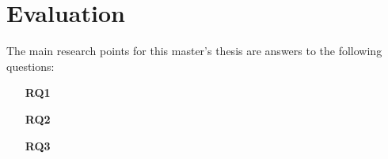 
\chapter{Evaluation}\label{chap:evaluation}

The main research points for this master's thesis are answers to the following questions:
\begin{itemize}
\item[\textbf{RQ1}]
\item[\textbf{RQ2}] 
\item[\textbf{RQ3}] 
\end{itemize}

